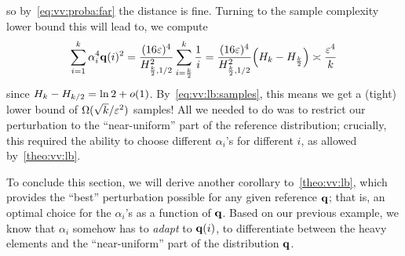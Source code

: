 so by~\cref{eq:vv:proba:far} the distance is fine. Turning to the sample complexity lower bound this will lead to, we compute
\[
	\sum_{i=1}^\ab \alpha_i^4 \q(i)^2 = \frac{(16\dst)^4}{H_{\frac{\ab}{2},1/2}^2}\sum_{i=\frac{\ab}{2}}^\ab \frac{1}{i} 
	= \frac{(16\dst)^4}{H_{\frac{\ab}{2},1/2}^2} \Paren{ H_{\ab} - H_{\frac{\ab}{2}} }
	\asymp \frac{\dst^4}{\ab}
\] 
since $H_{k} - H_{k/2} = \ln 2 + o(1)$. By~\cref{eq:vv:lb:samples}, this means we get a (tight) lower bound of $\Omega(\sqrt{k}/\varepsilon^2)$ samples! All we needed to do was to restrict our perturbation to the ``near-uniform'' part of the reference distribution; crucially, this required the ability to choose different $\alpha_i$'s for different $i$, as allowed by~\cref{theo:vv:lb}.\medskip

To conclude this section, we will derive another corollary to~\cref{theo:vv:lb}, which provides the ``best'' perturbation possible for any given reference $\mathbf{q}$; that is, an optimal choice for the $\alpha_i$'s as a function of $\mathbf{q}$. Based on our previous example, we know that $\alpha_i$ somehow has to \emph{adapt} to $\mathbf{q}(i)$, to differentiate between the heavy elements and the ``near-uniform'' part of the distribution $\mathbf{q}$.

